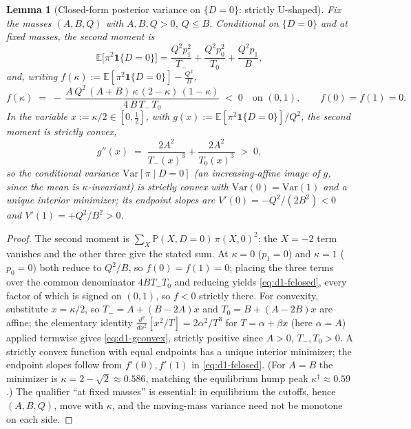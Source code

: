 \documentclass[11pt]{article}
\newtheorem{lemma}{Lemma}
\newcommand{\E}{\mathbb{E}}
\newcommand{\PP}{\mathbb{P}}
\newcommand{\1}{\mathbf{1}}
\newcommand{\Var}{\mathrm{Var}}
\begin{document}
\begin{lemma}[Closed-form posterior variance on $\{D=0\}$: strictly U-shaped]
\label{lem:d1-variance}
Fix the masses $(A,B,Q)$ with $A,B,Q>0$, $Q\le B$. Conditional on $\{D=0\}$ and
at fixed masses, the second moment is
\[
  \E\bigl[\pi^2\1\{D{=}0\}\bigr]
  =\frac{Q^2p_1^2}{T_-}+\frac{Q^2p_0^2}{T_0}+\frac{Q^2 p_1}{B},
\]
and, writing $f(\kappa):=\E[\pi^2\1\{D{=}0\}]-\tfrac{Q^2}{B}$,
\begin{equation}
  f(\kappa)\;=\;-\,\frac{A\,Q^{2}\,(A+B)\,\kappa\,(2-\kappa)\,(1-\kappa)}
                      {4\,B\,T_-\,T_0}\;<\;0\quad\text{on }(0,1),\qquad
  f(0)=f(1)=0 .
  \label{eq:d1-fclosed}
\end{equation}
In the variable $x:=\kappa/2\in[0,\tfrac12]$, with
$g(x):=\E[\pi^2\1\{D{=}0\}]/Q^2$, the second moment is strictly convex,
\begin{equation}
  g''(x)\;=\;\frac{2A^2}{T_-(x)^3}+\frac{2A^2}{T_0(x)^3}\;>\;0 ,
  \label{eq:d1-gconvex}
\end{equation}
so the conditional variance $\Var[\pi\mid D{=}0]$ (an increasing-affine image of
$g$, since the mean is $\kappa$-invariant) is strictly convex with
$\Var(0)=\Var(1)$ and a \emph{unique} interior minimizer; its endpoint slopes
are $V'(0)=-Q^2/(2B^2)<0$ and $V'(1)=+Q^2/B^2>0$.
\end{lemma}

\begin{proof}
The second moment is $\sum_X\PP(X,D{=}0)\,\pi(X,0)^2$: the $X{=}{-}2$ term
vanishes and the other three give the stated sum. At $\kappa=0$ ($p_1=0$) and
$\kappa=1$ ($p_0=0$) both reduce to $Q^2/B$, so $f(0)=f(1)=0$; placing the three
terms over the common denominator $4BT_-T_0$ and reducing yields
\eqref{eq:d1-fclosed}, every factor of which is signed on $(0,1)$, so $f<0$
strictly there. For convexity, substitute $x=\kappa/2$, so $T_-=A+(B-2A)x$ and
$T_0=B+(A-2B)x$ are affine; the elementary identity
$\tfrac{d^2}{dx^2}[x^2/T]=2\alpha^2/T^3$ for $T=\alpha+\beta x$ (here
$\alpha=A$) applied termwise gives \eqref{eq:d1-gconvex}, strictly positive
since $A>0$, $T_-,T_0>0$. A strictly convex function with equal endpoints has a
unique interior minimizer; the endpoint slopes follow from
$f'(0),f'(1)$ in \eqref{eq:d1-fclosed}. (For $A=B$ the minimizer is
$\kappa=2-\sqrt2\approx0.586$, matching the equilibrium hump peak
$\kappa^{\dagger}\approx0.59$.) The qualifier ``at fixed masses'' is essential:
in equilibrium the cutoffs, hence $(A,B,Q)$, move with $\kappa$, and the
moving-mass variance need not be monotone on each side.
\end{proof}
\end{document}
